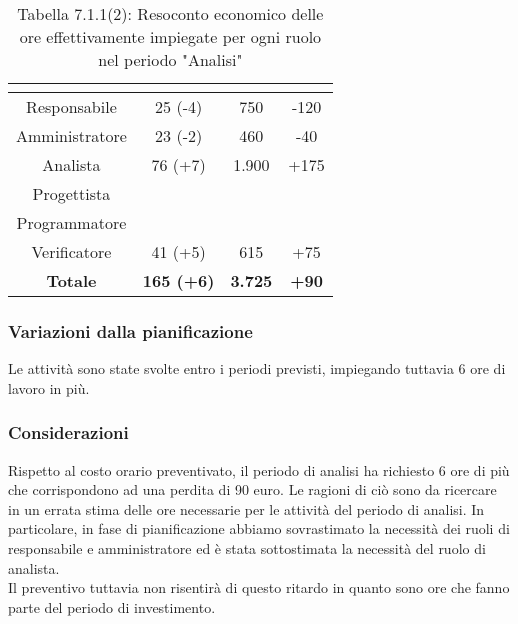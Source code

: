 \renewcommand{\arraystretch}{1.4}
\begin{table}[H]
\begin{center}
\begin{tabular}{|c|c|c|c|}
\hline
\rowcolor{title_row}
\textbf{\color{title_text}{Ruolo}}  & \textbf{\color{title_text}{Ore}} & \textbf{\color{title_text}{Costo in \euro}} & \textbf{\color{title_text}{Differenza al preventivo in \euro}} \\ \hline
Responsabile    & 25 (-4) & 750 & -120 \\ \hline
Amministratore  & 23 (-2) & 460 & -40 \\ \hline
Analista        & 76 (+7) & 1.900 & +175 \\ \hline
Progettista     & & &  \\ \hline
Programmatore   & & &  \\ \hline
Verificatore    & 41 (+5) & 615 & +75  \\ \hline
\textbf{Totale} & \textbf{165 (+6)}    & \textbf{3.725} & \textbf{+90} \\ \hline
\end{tabular}
\caption{Tabella 7.1.1(2): Resoconto economico delle ore effettivamente impiegate per ogni ruolo nel periodo "Analisi"\label{}}
\end{center}
\end{table}
\renewcommand{\arraystretch}{1}


\subsubsection{Variazioni dalla pianificazione}
Le attività sono state svolte entro i periodi previsti, impiegando tuttavia 6 ore di lavoro in più.

\subsubsection{Considerazioni}
Rispetto al costo orario preventivato, il periodo di analisi ha richiesto 6
ore di più che corrispondono ad una perdita di 90 euro. Le ragioni di ciò sono
da ricercare in un errata stima delle ore necessarie per le attività del periodo di analisi. In particolare, in fase di pianificazione abbiamo sovrastimato la necessità dei ruoli di responsabile e amministratore ed è stata sottostimata la necessità del ruolo di analista.  \\
Il preventivo tuttavia non risentirà di questo ritardo in quanto sono ore che fanno parte del periodo di investimento.
\pagebreak
